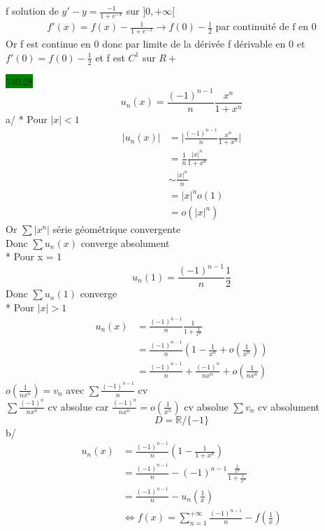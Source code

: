 \documentclass{article}
\begin{document}
f solution de \(y'-y = \frac{-1}{1+e^{-x}}\) sur \(]0, +\infty[\)\\
\begin{align*}
    f'(x) = f(x) - \frac{1}{1+e^{-x}}
    \rightarrow f(0) - \frac{1}{2} \text{ par continuité de f en 0}
\end{align*}
Or f est continue en 0 donc par limite de la dérivée
f dérivable en 0 et \(f'(0) = f(0) - \frac{1}{2}\)
et f est \(C^1\) sur \(R+\)

\noindent
\colorbox{green}{540.28}\\
\begin{equation*}
    u_n(x) = \frac{(-1)^{n-1}}{n} \frac{x^n}{1+x^n}
\end{equation*}
a/ * Pour \(|x| < 1\) \begin{align*}
    \big| u_n(x)\big| &= \big|\frac{(-1)^{n-1}}{n}\frac{x^n}{1+x^n}\big|\\
    &= \frac{1}{n}\frac{|x|^n}{1+x^n}\\
    &\sim \frac{|x|^n}{n}\\
    &= |x|^n o(1)\\
    &= o(|x|^n)
\end{align*}
Or \(\sum |x^n|\) série géométrique convergente \\
Donc \(\sum u_n(x)\) converge absolument \\
* Pour x = 1 \begin{equation*}
    u_n(1) = \frac{(-1)^{n-1}}{n}\frac{1}{2}
\end{equation*}
Donc \(\sum u_n(1)\) converge\\
* Pour \(|x| > 1\) \begin{align*}
    u_n(x) &= \frac{(-1)^{n-1}}{n} \frac{1}{1+\frac{1}{x^n}}\\
    &= \frac{(-1)^{n-1}}{n}(1-\frac{1}{x^n} + o(\frac{1}{x^n}))\\
    &= \frac{(-1)^{n-1}}{n}+\frac{(-1)^n}{nx^n} + o(\frac{1}{nx^n})
\end{align*}
\( o(\frac{1}{nx^n}) = v_n\)
avec \(\sum \frac{(-1)^{n-1}}{n}\) cv \\
\(\sum \frac{(-1)^{n}}{nx^n}\) cv absolue car \(\frac{(-1)^n}{nx^n} = o(\frac{1}{x^n})\) cv absolue 
\(\sum v_n\) cv absolument
\begin{equation*}
    D = \mathbb{R}/\{-1\}
\end{equation*}
b/ \begin{align*}
    u_n(x) &= \frac{(-1)^{n-1}}{n}(1-\frac{1}{1+x^n})\\
    &= \frac{(-1)^{n-1}}{n} - (-1)^{n-1} \frac{\frac{1}{x^n}}{1+\frac{1}{x^n}}\\
    &= \frac{(-1)^{n-1}}{n} - u_n(\frac{1}{x})\\
    &\Leftrightarrow f(x) = \sum_{n=1}^{+\infty} \frac{(-1)^{n-1}}{n} - f(\frac{1}{x})
\end{align*}
\end{document}
